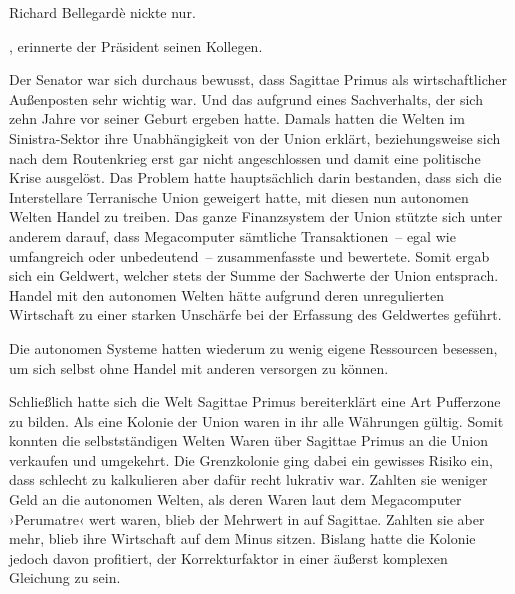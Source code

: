 Richard Bellegardè nickte nur. 

\par

, erinnerte der Präsident seinen Kollegen. 

\par

Der Senator war sich durchaus bewusst, dass Sagittae Primus als wirtschaftlicher Außenposten sehr wichtig war. Und das aufgrund eines Sachverhalts, der sich zehn Jahre vor seiner Geburt ergeben hatte. Damals hatten die Welten im Sinistra-Sektor ihre Unabhängigkeit von der Union erklärt, beziehungsweise sich nach dem Routenkrieg erst gar nicht angeschlossen und damit eine politische Krise ausgelöst. Das Problem hatte hauptsächlich darin bestanden, dass sich die Interstellare Terranische Union geweigert hatte, mit diesen nun autonomen Welten Handel zu treiben. Das ganze Finanzsystem der Union stützte sich unter anderem darauf, dass Megacomputer sämtliche Transaktionen~-- egal wie umfangreich oder unbedeutend~-- zusammenfasste und bewertete. Somit ergab sich ein Geldwert, welcher stets der Summe der Sachwerte der Union entsprach. Handel mit den autonomen Welten hätte aufgrund deren unregulierten Wirtschaft zu einer starken Unschärfe bei der Erfassung des Geldwertes geführt.

\par

Die autonomen Systeme hatten wiederum zu wenig eigene Ressourcen besessen, um sich selbst ohne Handel mit anderen versorgen zu können.

\par

Schließlich hatte sich die Welt Sagittae Primus bereiterklärt eine Art Pufferzone zu bilden. Als eine Kolonie der Union waren in ihr alle Währungen gültig. Somit konnten die selbstständigen Welten Waren über Sagittae Primus an die Union verkaufen und umgekehrt. Die Grenzkolonie ging dabei ein gewisses Risiko ein, dass schlecht zu kalkulieren aber dafür recht lukrativ war. Zahlten sie weniger Geld an die autonomen Welten, als deren Waren laut dem Megacomputer ›Perumatre‹ wert waren, blieb der Mehrwert in auf Sagittae. Zahlten sie aber mehr, blieb ihre Wirtschaft auf dem Minus sitzen. Bislang hatte die Kolonie jedoch davon profitiert, der Korrekturfaktor in einer äußerst komplexen Gleichung zu sein.

